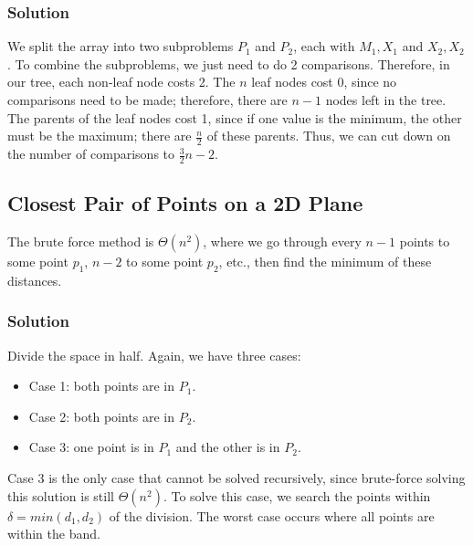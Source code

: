 \documentclass[11pt]{article}
\begin{document}
\subsubsection{Solution}
We split the array into two subproblems $P_1$ and $P_2$, each with $M_1, X_1$ and $X_2, X_2$. To combine the subproblems, we just need to do 2 comparisons. Therefore, in our tree, each non-leaf node costs 2. The $n$ leaf nodes cost 0, since no comparisons need to be made; therefore, there are $n-1$ nodes left in the tree. The parents of the leaf nodes cost 1, since if one value is the minimum, the other must be the maximum; there are $\frac{n}{2}$ of these parents. Thus, we can cut down on the number of comparisons to $\frac{3}{2}n-2$.

\subsection{Closest Pair of Points on a 2D Plane}
The brute force method is $\Theta(n^2)$, where we go through every $n-1$ points to some point $p_1$, $n-2$ to some point $p_2$, etc., then find the minimum of these distances.

\subsubsection{Solution}
Divide the space in half. Again, we have three cases:
\begin{itemize}
    \item Case 1: both points are in $P_1$.
    \item Case 2: both points are in $P_2$.
    \item Case 3: one point is in $P_1$ and the other is in $P_2$.
\end{itemize}
Case 3 is the only case that cannot be solved recursively, since brute-force solving this solution is still $\Theta(n^2)$. To solve this case, we search the points within $\delta = min(d_1, d_2)$ of the division. The worst case occurs where all points are within the band.
\end{document}
